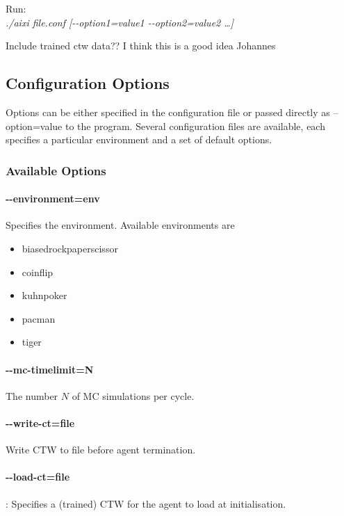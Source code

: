 \documentclass[paper=a4, fontsize=11pt]{scrartcl} %
\numberwithin{equation}{section} %
\numberwithin{figure}{section} %
\numberwithin{table}{section} %
\begin{document}
\bigskip

\noindent Run:\\
\indent \textit{./aixi file.conf [-{}-option1=value1 -{}-option2=value2 \dots]}


Include trained ctw data?? I think this is a good idea Johannes

\subsection{Configuration Options}

Options can be either specified in the configuration file or passed directly as --option=value to the program. Several configuration files are available, each specifies a particular environment and a set of default options. 

\subsubsection*{Available Options}

\paragraph{-{}-environment=env} Specifies the environment. Available environments are
\begin{itemize}
\itemsep0pt
\renewcommand\labelitemi{--}
    \item biased\textunderscore rock\textunderscore paper\textunderscore scissor
    \item coinflip
    \item kuhn\textunderscore poker
    \item pacman
    \item tiger
\end{itemize}

\paragraph{-{}-mc-timelimit=N} The number $N$ of MC simulations per cycle.
\paragraph{-{}-write-ct=file} Write CTW to file before agent termination.
\paragraph{-{}-load-ct=file}: Specifies a (trained) CTW for the agent to load at initialisation.
\end{document}
